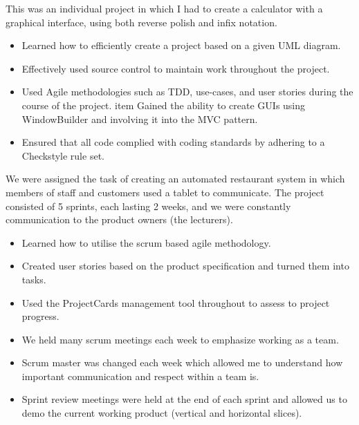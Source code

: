 \documentclass[10pt,a4paper]{moderncv}
\begin{document}
        {
        This was an individual project in which I had to create a calculator with a graphical interface, using both reverse polish and infix notation.
        \begin{itemize}
            \item Learned how to efficiently create a project based on a given UML diagram.
            \item Effectively used source control to maintain work throughout the project.
            \item Used Agile methodologies such as TDD, use-cases, and user stories during the course of the project.
            item Gained the ability to create GUIs using WindowBuilder and involving it into the MVC pattern.
            \item Ensured that all code complied with coding standards by adhering to a Checkstyle rule set.
        \end{itemize}
        }
        {
        We were assigned the task of creating an automated restaurant system in which members of staff and customers used a tablet to communicate. The project consisted of 5 sprints, each lasting 2 weeks, and we were constantly communication to the product owners (the lecturers).
        \begin{itemize}
            \item Learned how to utilise the scrum based agile methodology.
            \item Created user stories based on the product specification and turned them into tasks.
            \item Used the ProjectCards management tool throughout to assess to project progress.
            \item We held many scrum meetings each week to emphasize working as a team.
            \item Scrum master was changed each week which allowed me to understand how important communication and respect within a team is.
            \item Sprint review meetings were held at the end of each sprint and allowed us to demo the current working product (vertical and horizontal slices).
        \end{itemize}
        }
    
\end{document}
